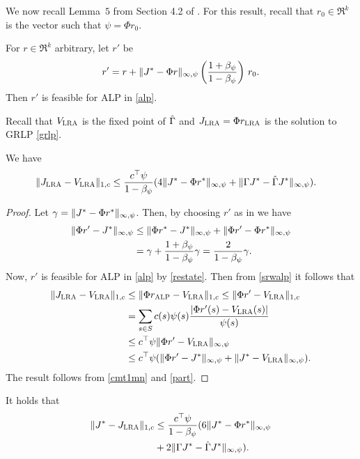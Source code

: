 We now recall Lemma~$5$ from Section 4.2 of \cite{ALP}. 
For this result, recall that $r_0 \in \Re^k$ is the vector such that $\psi = \Phi r_0$.
\begin{lemma}\label{restate}
For  $r \in \Re^k$ arbitrary, let $r'$ be
\begin{align}
r'= r+\|J^*-\Phi r\|_{\infty,\psi} \left(\frac{1+\beta_{\psi}}{1-\beta_{\psi}}\right)\, r_0.
\end{align}
Then $r'$ is feasible for ALP in \eqref{alp}.
\end{lemma}
Recall that $V_{\text{\sc LRA}}$ is the fixed point of $\hat{\Gamma}$ and $J_{\text{\sc LRA}}=\Phi r_{\text{\sc LRA}}$ is the solution to GRLP
\eqref{grlp}. 
\begin{theorem}\label{mt2mn}
We have
\begin{align}
\|J_{\text{\sc LRA}}-V_{\text{\sc LRA}}\|_{1,c}&\leq \frac{c^\top \psi}{1-\beta_\psi}(4\|J^*-\Phi r^*\|_{\infty,\psi}\nonumber
+\|\Gamma J^*-\hat{\Gamma} J^*\|_{\infty,\psi}).
\end{align}
\end{theorem}
\begin{proof}
Let $\gamma=\|J^*-\Phi r^*\|_{\infty,\psi}$.
Then, by choosing $r'$ as in  we have
\begin{align}
\norm{\Phi r'-J^*}_{\mn}\nn
&\leq \norm{\Phi r^*-J^*}_{\mn}+\norm{\Phi r'-\Phi r^*}_{\mn}\nn\\
&=\gamma+\frac{1+\beta_\psi}{1-\beta_\psi}\gamma
	=\frac{2}{1-\beta_\psi}\gamma.
\label{part}
\end{align}
Now, $r'$ is feasible for ALP in \eqref{alp} by \cref{restate}.
Then from \cref{srwalp} it follows that
\begin{align}
\|J_{\text{\sc LRA}}-V_{\text{\sc LRA}}\|_{1,c}
&\leq\|\Phi r_{\text{\sc ALP}}-V_{\text{\sc LRA}}\|_{1,c}\leq\|\Phi r'-V_{\text{\sc LRA}}\|_{1,c}\nonumber\\
&=\sum_{s\in S}c(s)\psi(s)\frac{|\Phi r'(s)-V_{\text{\sc LRA}}(s)|}{\psi(s)}\nonumber\\
&\leq c^\top \psi \|\Phi r'-V_{\text{\sc LRA}}\|_{\infty,\psi}\nonumber\\
&\leq c^\top \psi (\|\Phi r'-J^*\|_{\infty,\psi}+\|J^*-V_{\text{\sc LRA}}\|_{\infty,\psi}).\nonumber
\end{align}
The result follows from \cref{cmt1mn} and \eqref{part}.
\end{proof}
\begin{theorem}
\label{cmt2mn}
It holds that
\begin{align}\label{finalbndmn}
\begin{split}
\norm{J^*-\hj}_{1,c}
&\leq\frac{c^\top\psi}{1-\beta_\psi}(6 \norm{J^*-\Phi r^*}_{\mn}\\
&+2\norm{\Gamma J^*-\hg J^*}_{\mn}).
\end{split}
\end{align}
\end{theorem}
